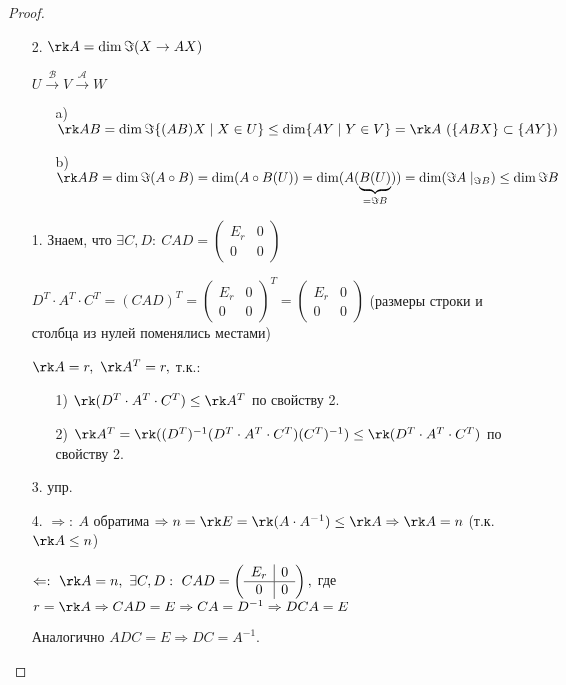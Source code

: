 \begin{proof}
    \begin{enumerate}
        \item[]
        \item[2.] $\rk A=\dim \Im (X\rightarrow AX)$

        $U\xrightarrow{\mathcal{B}}V\xrightarrow{\mathcal{A}}W$

        \begin{enumerate}
            \item[a)] $\rk AB=\dim \Im \{(AB)X\mid X\in U \}\leq \dim 
\{AY\mid Y\in V\}=\rk A\ (\{ABX\}\subset\{AY\})$
            \item[b)] $\rk AB=\dim \Im (A\circ B)=\dim (A\circ B(U))=\dim 
(A(\underbrace{B(U)}_{=\Im B}))=\dim (\Im A\mid_{\Im B})\leq \dim \Im B$
        \end{enumerate}
        \item[1.] Знаем, что $\exists C,D:\ 
CAD=\left(\begin{array}{c|c}E_r & 0\\\hline 0 & 0\end{array}\right)$

        $D^T\cdot A^T\cdot C^T=(CAD)^T=\left(\begin{array}{c|c}E_r & 
0\\\hline 0 & 0\end{array}\right)^T=\left(\begin{array}{c|c}E_r & 
0\\\hline 0 & 0\end{array}\right)$ (размеры строки и столбца из нулей 
поменялись местами)

        $\rk A=r,\ \rk A^T=r,$ т.к.:
        \begin{enumerate}
            \item[1)] $\rk (D^T\cdot A^T\cdot C^T)\leq \rk A^T$ по 
свойству 2.
            \item[2)] $\rk A^T=\rk ((D^T)^{-1}(D^T\cdot A^T\cdot 
C^T)(C^T)^{-1})\leq \rk (D^T\cdot A^T\cdot C^T)$ по свойству 2.
        \end{enumerate}
        \item[3.] упр.
        \item[4.] $\Rightarrow:\ A$ обратима $\Rightarrow n=\rk 
E=\rk(A\cdot A^{-1})\leq \rk A\Rightarrow \rk A=n$ (т.к. $\rk A\leq n$)

        $\Leftarrow:\ \rk A=n,\ \exists C,D:\ 
CAD=\left(\begin{array}{c|c}E_r & 0\\\hline 0 & 0\end{array}\right),$ где 
$r=\rk A\Rightarrow CAD=E\Rightarrow CA=D^{-1}\Rightarrow DCA=E$

        Аналогично $ADC=E\Rightarrow DC=A^{-1}$.
    \end{enumerate}
\end{proof}

